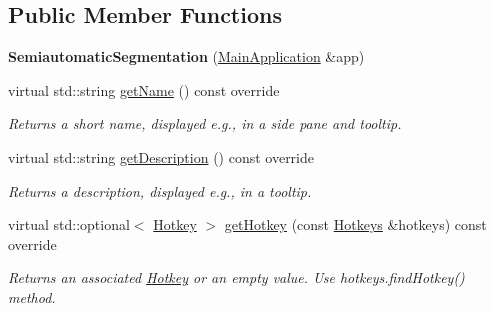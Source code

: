 \subsection*{Public Member Functions}
\begin{DoxyCompactItemize}
\item 
\mbox{\label{classpepr3d_1_1_semiautomatic_segmentation_ac17cad75cd7d333414c0d5db567026d6}} 
{\bfseries Semiautomatic\+Segmentation} (\mbox{\hyperlink{classpepr3d_1_1_main_application}{Main\+Application}} \&app)
\item 
\mbox{\label{classpepr3d_1_1_semiautomatic_segmentation_a2c30b8fe02de8112fc4295ba78d29077}} 
virtual std\+::string \mbox{\hyperlink{classpepr3d_1_1_semiautomatic_segmentation_a2c30b8fe02de8112fc4295ba78d29077}{get\+Name}} () const override
\begin{DoxyCompactList}\small\item\em Returns a short name, displayed e.\+g., in a side pane and tooltip. \end{DoxyCompactList}\item 
\mbox{\label{classpepr3d_1_1_semiautomatic_segmentation_a181a28ad82f889489264ad75e3d41e6e}} 
virtual std\+::string \mbox{\hyperlink{classpepr3d_1_1_semiautomatic_segmentation_a181a28ad82f889489264ad75e3d41e6e}{get\+Description}} () const override
\begin{DoxyCompactList}\small\item\em Returns a description, displayed e.\+g., in a tooltip. \end{DoxyCompactList}\item 
\mbox{\label{classpepr3d_1_1_semiautomatic_segmentation_ac660a9823195bf2d3df1066b177fc1d8}} 
virtual std\+::optional$<$ \mbox{\hyperlink{structpepr3d_1_1_hotkey}{Hotkey}} $>$ \mbox{\hyperlink{classpepr3d_1_1_semiautomatic_segmentation_ac660a9823195bf2d3df1066b177fc1d8}{get\+Hotkey}} (const \mbox{\hyperlink{classpepr3d_1_1_hotkeys}{Hotkeys}} \&hotkeys) const override
\begin{DoxyCompactList}\small\item\em Returns an associated \mbox{\hyperlink{structpepr3d_1_1_hotkey}{Hotkey}} or an empty value. Use hotkeys.\+find\+Hotkey() method. \end{DoxyCompactList}\item 

\end{DoxyCompactItemize}
